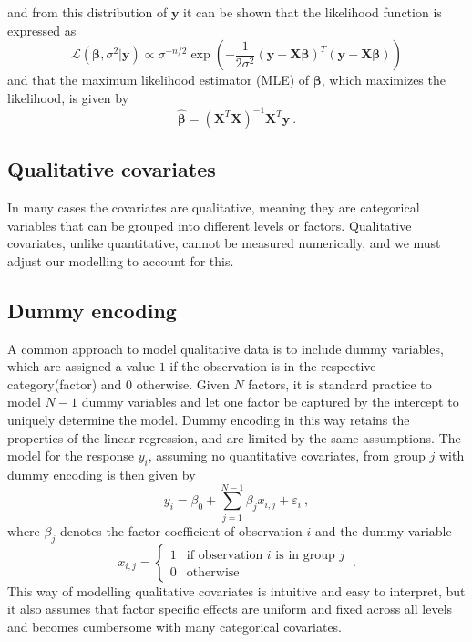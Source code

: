 and from this distribution of $\mathbf{y}$ it can be shown that the likelihood function is expressed as
\begin{equation}
    \mathcal{L}(\boldsymbol{\beta}, \sigma^2 \lvert \mathbf{y}) \propto \sigma^{-n/2}\exp\left(-\frac{1}{2\sigma^2}(\mathbf{y}-\mathbf{X}\boldsymbol{\beta})^T(\mathbf{y}-\mathbf{X}\boldsymbol{\beta})\right)
\end{equation}
and that the maximum likelihood estimator (MLE) of $\boldsymbol{\beta}$, which maximizes the likelihood, is given by
\begin{equation}
    \label{eq:beta_hat}
    \hat{\boldsymbol{\beta}} = (\mathbf{X}^T\mathbf{X})^{-1}\mathbf{X}^T\mathbf{y} \ .
\end{equation}

\subsection{Qualitative covariates}
\label{sec:qualitative}
In many cases the covariates are qualitative, meaning they are categorical variables that can be grouped into different levels or factors.
Qualitative covariates, unlike quantitative, cannot be measured numerically, and we must adjust our modelling to account for this.
\subsection{Dummy encoding}
A common approach to model qualitative data is to include dummy variables, which are assigned a value $1$ if the observation is in the respective category(factor) and $0$ otherwise.
Given $N$ factors, it is standard practice to model $N-1$ dummy variables and let one factor be captured by the intercept to uniquely determine the model.
Dummy encoding in this way retains the properties of the linear regression, and are limited by the same assumptions.
The model for the response $y_i$, assuming no quantitative covariates, from group $j$ with dummy encoding is then given by
\begin{equation}
    y_i =  \beta_0 + \sum_{j=1}^{N-1} \beta_j x_{i,j} + \varepsilon_i \ ,
\end{equation}
where $\beta_j$ denotes the factor coefficient of observation $i$ and the dummy variable
\begin{equation}
    x_{i,j} = \begin{cases}
        1 & \text{if observation $i$ is in group $j$} \\
        0 & \text{otherwise}
    \end{cases} \ .
\end{equation}
This way of modelling qualitative covariates is intuitive and easy to interpret, but it also assumes that factor specific effects are uniform and fixed across all levels and becomes cumbersome with many categorical covariates. 


